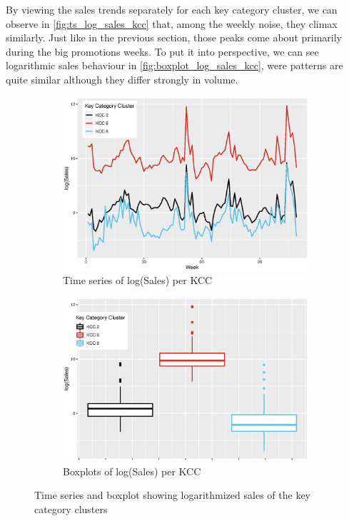 

By viewing the sales trends separately for each key category cluster, we can observe in \autoref{fig:ts_log_sales_kcc} that, among the weekly noise, they climax similarly. Just like in the previous section, those peaks come about primarily during the big promotions weeks. To put it into perspective, we can see logarithmic sales behaviour in \autoref{fig:boxplot_log_sales_kcc}, were patterns are quite similar although they differ strongly in volume. \\

 \begin{figure}[H]
\centering
\begin{subfigure}{.45\textwidth}
  \centering
  \includegraphics[width=\linewidth]{figures/ts_log_sales_kcc.eps}
  \caption{Time series of log(Sales) per KCC}
  \label{fig:ts_log_sales_kcc}
\end{subfigure}
\begin{subfigure}{.45\textwidth}
  \centering
  \includegraphics[width=\linewidth]{figures/boxplot_log_sales_kcc.eps}
  \caption{Boxplots of log(Sales) per KCC}
  \label{fig:boxplot_log_sales_kcc}
\end{subfigure}
\caption{Time series and boxplot showing logarithmized sales of the key category clusters}
\label{fig:kcc_ts_and_boxplot}
\end{figure} 




